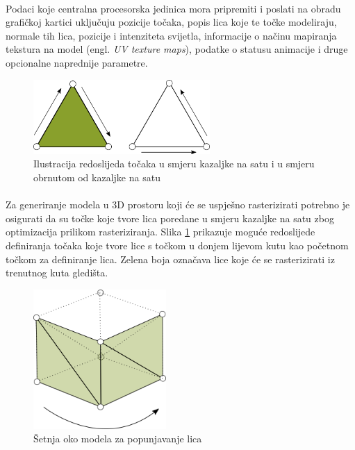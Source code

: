 \documentclass[times, utf8, diplomski]{fer}
\begin{document}
\paragraph{}
Podaci koje centralna procesorska jedinica mora pripremiti i poslati na obradu grafičkoj 
kartici uključuju pozicije točaka, popis lica koje te točke modeliraju, normale tih lica, 
pozicije i intenziteta svijetla, informacije o načinu mapiranja tekstura na model (engl. 
\textit{UV texture maps}), podatke o statusu animacije i druge opcionalne naprednije 
parametre.

\begin{figure}[h]
	\centering
	\includegraphics[width=0.6\textwidth]{img/21-1}
	\caption{Ilustracija redoslijeda točaka u smjeru kazaljke na satu i u smjeru obrnutom od kazaljke na satu}
	\label{fig:21-1}
\end{figure}

\paragraph{}
Za generiranje modela u 3D prostoru koji će se uspješno rasterizirati potrebno je osigurati 
da su točke koje tvore lica poredane u smjeru kazaljke na satu zbog optimizacija prilikom
rasteriziranja. Slika \ref{fig:21-1} prikazuje moguće redoslijede definiranja točaka koje 
tvore lice s točkom u donjem lijevom kutu kao početnom točkom za definiranje lica. Zelena boja označava lice koje će se rasterizirati iz trenutnog kuta gledišta.

\begin{figure}[h]
	\centering
	\includegraphics[width=0.45\textwidth]{img/21-2}
	\caption{Šetnja oko modela za popunjavanje lica}
	\label{fig:21-2}
\end{figure}
\end{document}
